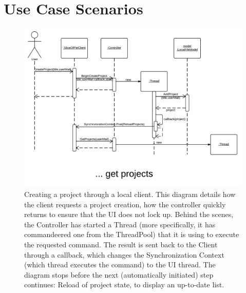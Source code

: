 \section{Use Case Scenarios}
\label{sec:usecasescenarios}

\begin{figure}[htb]
	\centering
	\includegraphics[width=1\textwidth]{Appendices/graphics/usecasescenario-createproject-local.png}
	\caption{Creating a project through a local client. This diagram details how the client requests a project
        creation, how the controller quickly returns to ensure that the UI does not lock up. Behind the scenes,
        the Controller has started a Thread (more specifically, it has commandeered one from the ThreadPool) that
        it is using to execute the requested command. The result is sent back to the Client through a callback,
        which changes the Synchronization Context (which thread executes the command) to the UI thread. The diagram
        stops before the next (automatically initiated) step continues: Reload of project state, to display an
        up-to-date list.}
	\label{fig:usecasescenario-01}
\end{figure}